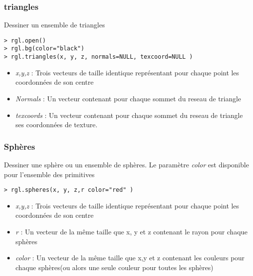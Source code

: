 \subsubsection{triangles}

Dessiner un ensemble de triangles

\begin{lstlisting}
> rgl.open()
> rgl.bg(color="black")
> rgl.triangles(x, y, z, normals=NULL, texcoord=NULL )
\end{lstlisting}

\begin{itemize}
\item \textit{x,y,z} : Trois vecteurs de taille identique représentant pour chaque point les coordonnées de son centre
\item \textit{Normals} : Un vecteur contenant pour chaque sommet du reseau de triangle
\item \textit{texcoords} : Un vecteur contenant pour chaque sommet du reseau de triangle ses coordonnées de texture.
\end{itemize}

\subsubsection{Sphères}

Dessiner une sphère ou un ensemble de sphères. Le paramètre \textit{color} est disponible pour l'ensemble des primitives
\begin{lstlisting}
> rgl.spheres(x, y, z,r color="red" )
\end{lstlisting}

\begin{itemize}
\item \textit{x,y,z} : Trois vecteurs de taille identique représentant pour chaque point les coordonnées de son centre
\item \textit{r} : Un vecteur de la même taille que x, y et z contenant le rayon pour chaque sphères 
\item \textit{color} : Un vecteur de la même taille que x,y et z contenant les couleurs pour chaque sphères(ou alors une seule couleur pour toutes les sphères)
\end{itemize}

\newpage

